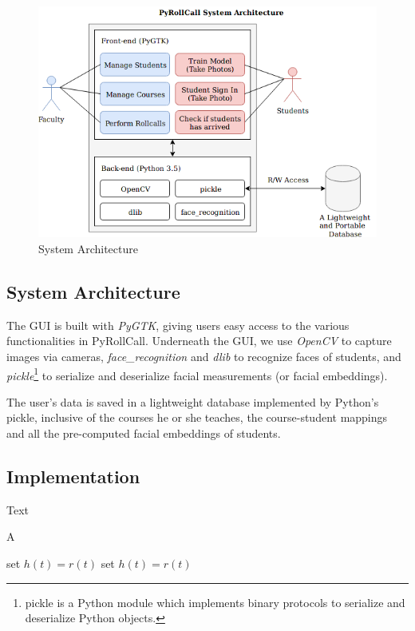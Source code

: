 \begin{figure}[!htb]
  \centering
  \includegraphics[width=\linewidth]{figures/system-architecture.png}
  \caption{System Architecture}
  \label{fig:system-architecture}
\end{figure}


\subsection{System Architecture}
The GUI is built with \emph{PyGTK}, giving users easy access to the
various functionalities in PyRollCall. Underneath the GUI, we use
\emph{OpenCV} to capture images via cameras, \emph{face\_recognition} and \emph{dlib} to
recognize faces of students, and \emph{pickle}\footnote{pickle is a Python module
  which implements binary protocols to serialize and deserialize Python objects.}
to serialize and deserialize facial measurements (or facial embeddings).
\vspace{0.5cm}

The user's data is saved in a lightweight database implemented by Python's pickle,
inclusive of the courses he or she teaches, the course-student mappings and
all the pre-computed facial embeddings of students.


\subsection{Implementation}
Text

\begin{algorithm}
\caption{A}
\label{alg:A}
\begin{algorithmic}
\REPEAT
\STATE set $h(t)=r(t)$
\REPEAT
\STATE set $h(t)=r(t)$
\end{algorithmic}
\end{algorithm}
